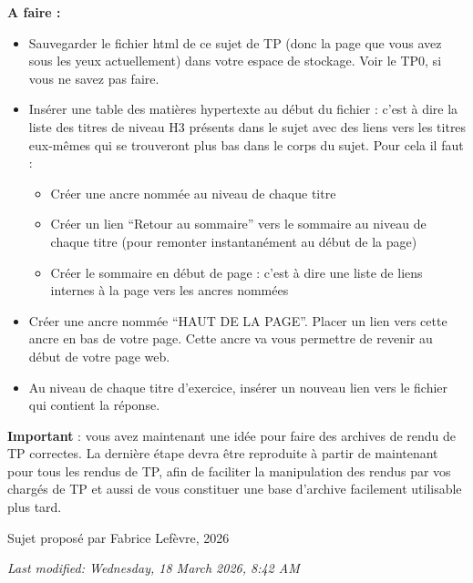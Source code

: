 \documentclass[a4paper,11pt]{article}
\begin{document}
\begin{afaire}
\textbf{A faire :}

\begin{itemize}
    \item Sauvegarder le fichier html de ce sujet de TP (donc la page que vous avez sous les yeux actuellement) dans votre espace de stockage. Voir le TP0, si vous ne savez pas faire.
    \item Insérer une table des matières hypertexte au début du fichier : c'est à dire la liste des titres de niveau H3 présents dans le sujet avec des liens vers les titres eux-mêmes qui se trouveront plus bas dans le corps du sujet. Pour cela il faut :
    \begin{itemize}
        \item Créer une ancre nommée au niveau de chaque titre
        \item Créer un lien ``Retour au sommaire'' vers le sommaire au niveau de chaque titre (pour remonter instantanément au début de la page)
        \item Créer le sommaire en début de page : c'est à dire une liste de liens internes à la page vers les ancres nommées
    \end{itemize}
    \item Créer une ancre nommée ``HAUT DE LA PAGE''. Placer un lien vers cette ancre en bas de votre page. Cette ancre va vous permettre de revenir au début de votre page web.
    \item Au niveau de chaque titre d'exercice, insérer un nouveau lien vers le fichier qui contient la réponse.
\end{itemize}
\end{afaire}

\textcolor{rougetitre}{\textbf{Important}} : vous avez maintenant une idée pour faire des archives de rendu de TP correctes. La dernière étape devra être reproduite à partir de maintenant pour tous les rendus de TP, afin de faciliter la manipulation des rendus par vos chargés de TP et aussi de vous constituer une base d'archive facilement utilisable plus tard.

\vspace{1em}
\noindent\textcopyright{} Sujet proposé par Fabrice Lefèvre, 2026

\vspace{0.5em}
\noindent\textit{Last modified: Wednesday, 18 March 2026, 8:42 AM}

\newpage
{}
\appendix
\end{document}
